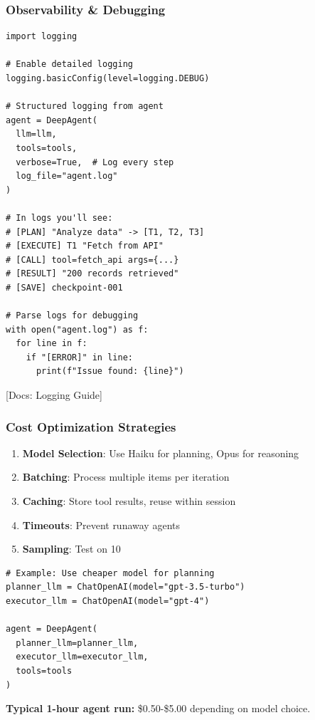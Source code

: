 \documentclass[aspectratio=169,11pt]{beamer}
\newcommand{\docref}[1]{{\scriptsize\color{docgray}[Docs: #1]}}
\begin{document}
\begin{frame}[fragile]
\frametitle{Observability \& Debugging}

\begin{lstlisting}
import logging

# Enable detailed logging
logging.basicConfig(level=logging.DEBUG)

# Structured logging from agent
agent = DeepAgent(
  llm=llm,
  tools=tools,
  verbose=True,  # Log every step
  log_file="agent.log"
)

# In logs you'll see:
# [PLAN] "Analyze data" -> [T1, T2, T3]
# [EXECUTE] T1 "Fetch from API"
# [CALL] tool=fetch_api args={...}
# [RESULT] "200 records retrieved"
# [SAVE] checkpoint-001

# Parse logs for debugging
with open("agent.log") as f:
  for line in f:
    if "[ERROR]" in line:
      print(f"Issue found: {line}")
\end{lstlisting}

\docref{Logging Guide}

\end{frame}

\begin{frame}[fragile]
\frametitle{Cost Optimization Strategies}

\begin{enumerate}
    \setlength{\itemsep}{1pt}
  \item \textbf{Model Selection}: Use Haiku for planning, Opus for reasoning
  \item \textbf{Batching}: Process multiple items per iteration
  \item \textbf{Caching}: Store tool results, reuse within session
  \item \textbf{Timeouts}: Prevent runaway agents
  \item \textbf{Sampling}: Test on 10%
\end{enumerate}

\vspace{1em}
\begin{lstlisting}
# Example: Use cheaper model for planning
planner_llm = ChatOpenAI(model="gpt-3.5-turbo")
executor_llm = ChatOpenAI(model="gpt-4")

agent = DeepAgent(
  planner_llm=planner_llm,
  executor_llm=executor_llm,
  tools=tools
)
\end{lstlisting}

\vspace{0.5em}
\textcolor{lcblue}{\textbf{Typical 1-hour agent run:}} \$0.50-\$5.00 depending on model choice.

\end{frame}
\end{document}
